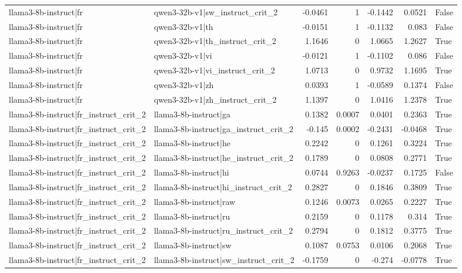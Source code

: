 \begin{table}
\begin{tabular}{l l r r r r l}
llama3-8b-instruct|fr & qwen3-32b-v1|sw_instruct_crit_2 & -0.0461 & 1 & -0.1442 & 0.0521 & False \\
llama3-8b-instruct|fr & qwen3-32b-v1|th & -0.0151 & 1 & -0.1132 & 0.083 & False \\
llama3-8b-instruct|fr & qwen3-32b-v1|th_instruct_crit_2 & 1.1646 & 0 & 1.0665 & 1.2627 & True \\
llama3-8b-instruct|fr & qwen3-32b-v1|vi & -0.0121 & 1 & -0.1102 & 0.086 & False \\
llama3-8b-instruct|fr & qwen3-32b-v1|vi_instruct_crit_2 & 1.0713 & 0 & 0.9732 & 1.1695 & True \\
llama3-8b-instruct|fr & qwen3-32b-v1|zh & 0.0393 & 1 & -0.0589 & 0.1374 & False \\
llama3-8b-instruct|fr & qwen3-32b-v1|zh_instruct_crit_2 & 1.1397 & 0 & 1.0416 & 1.2378 & True \\
llama3-8b-instruct|fr_instruct_crit_2 & llama3-8b-instruct|ga & 0.1382 & 0.0007 & 0.0401 & 0.2363 & True \\
llama3-8b-instruct|fr_instruct_crit_2 & llama3-8b-instruct|ga_instruct_crit_2 & -0.145 & 0.0002 & -0.2431 & -0.0468 & True \\
llama3-8b-instruct|fr_instruct_crit_2 & llama3-8b-instruct|he & 0.2242 & 0 & 0.1261 & 0.3224 & True \\
llama3-8b-instruct|fr_instruct_crit_2 & llama3-8b-instruct|he_instruct_crit_2 & 0.1789 & 0 & 0.0808 & 0.2771 & True \\
llama3-8b-instruct|fr_instruct_crit_2 & llama3-8b-instruct|hi & 0.0744 & 0.9263 & -0.0237 & 0.1725 & False \\
llama3-8b-instruct|fr_instruct_crit_2 & llama3-8b-instruct|hi_instruct_crit_2 & 0.2827 & 0 & 0.1846 & 0.3809 & True \\
llama3-8b-instruct|fr_instruct_crit_2 & llama3-8b-instruct|raw & 0.1246 & 0.0073 & 0.0265 & 0.2227 & True \\
llama3-8b-instruct|fr_instruct_crit_2 & llama3-8b-instruct|ru & 0.2159 & 0 & 0.1178 & 0.314 & True \\
llama3-8b-instruct|fr_instruct_crit_2 & llama3-8b-instruct|ru_instruct_crit_2 & 0.2794 & 0 & 0.1812 & 0.3775 & True \\
llama3-8b-instruct|fr_instruct_crit_2 & llama3-8b-instruct|sw & 0.1087 & 0.0753 & 0.0106 & 0.2068 & True \\
llama3-8b-instruct|fr_instruct_crit_2 & llama3-8b-instruct|sw_instruct_crit_2 & -0.1759 & 0 & -0.274 & -0.0778 & True \\

\end{tabular}
\end{table}
